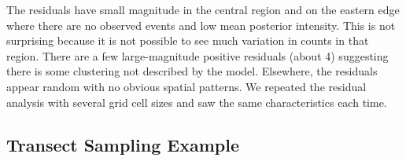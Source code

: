 \documentclass{interact}
\begin{document}
The residuals have small magnitude in the central region and on the eastern
edge where there are no observed events and low mean posterior intensity. This
is not surprising because it is not possible to see much variation in counts
in that region. There are a few large-magnitude positive residuals (about 4)
suggesting there is some clustering not described by the model. Elsewhere, the
residuals appear random with no obvious spatial patterns. We repeated the
residual analysis with several grid cell sizes and saw the same characteristics
each time.


\subsection{Transect Sampling Example}
\label{xsectanalysis}

\begin{figure}[p!]\centering





\end{figure}
\end{document}
